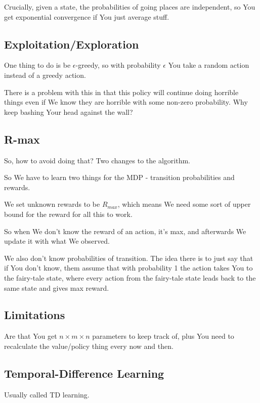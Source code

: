 \documentclass{article}
\begin{document}
		Crucially, given a state, the probabilities of going places are independent, so You get exponential convergence if You just average stuff.
		
	\subsection{Exploitation/Exploration}
		
		One thing to do is be $\epsilon$-greedy, so with probability $\epsilon$ You take a random action instead of a greedy action.
		
		There is a problem with this in that this policy will continue doing horrible things even if We know they are horrible with some non-zero probability. Why keep bashing Your head against the wall?
		
	\subsection{R-max}
	
		So, how to avoid doing that? Two changes to the algorithm. 
		
		So We have to learn two things for the MDP - transition probabilities and rewards.
		
		We set unknown rewards to be $R_{max}$, which means We need some sort of upper bound for the reward for all this to work.
		
		So when We don't know the reward of an action, it's max, and afterwards We update it with what We observed.
		
		We also don't know probabilities of transition. The idea there is to just say that if You don't know, them assume that with probability 1 the action takes You to the fairy-tale state, where every action from the fairy-tale state leads back to the same state and gives max reward.
		
	\subsection{Limitations}
	
		Are that You get $n\times m \times n$ parameters to keep track of, plus You need to recalculate the value/policy thing every now and then.
		
	\subsection{Temporal-Difference Learning}
	
		Usually called TD learning.
		
\end{document}
